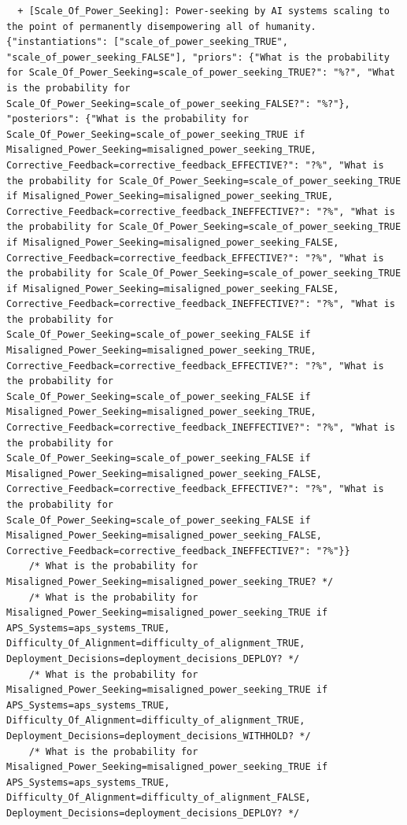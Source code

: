 \documentclass[
  11pt,
  letterpaper,
]{book}
\begin{document}
\begin{verbatim}
  + [Scale_Of_Power_Seeking]: Power-seeking by AI systems scaling to the point of permanently disempowering all of humanity. {"instantiations": ["scale_of_power_seeking_TRUE", "scale_of_power_seeking_FALSE"], "priors": {"What is the probability for Scale_Of_Power_Seeking=scale_of_power_seeking_TRUE?": "%?", "What is the probability for Scale_Of_Power_Seeking=scale_of_power_seeking_FALSE?": "%?"}, "posteriors": {"What is the probability for Scale_Of_Power_Seeking=scale_of_power_seeking_TRUE if Misaligned_Power_Seeking=misaligned_power_seeking_TRUE, Corrective_Feedback=corrective_feedback_EFFECTIVE?": "?%", "What is the probability for Scale_Of_Power_Seeking=scale_of_power_seeking_TRUE if Misaligned_Power_Seeking=misaligned_power_seeking_TRUE, Corrective_Feedback=corrective_feedback_INEFFECTIVE?": "?%", "What is the probability for Scale_Of_Power_Seeking=scale_of_power_seeking_TRUE if Misaligned_Power_Seeking=misaligned_power_seeking_FALSE, Corrective_Feedback=corrective_feedback_EFFECTIVE?": "?%", "What is the probability for Scale_Of_Power_Seeking=scale_of_power_seeking_TRUE if Misaligned_Power_Seeking=misaligned_power_seeking_FALSE, Corrective_Feedback=corrective_feedback_INEFFECTIVE?": "?%", "What is the probability for Scale_Of_Power_Seeking=scale_of_power_seeking_FALSE if Misaligned_Power_Seeking=misaligned_power_seeking_TRUE, Corrective_Feedback=corrective_feedback_EFFECTIVE?": "?%", "What is the probability for Scale_Of_Power_Seeking=scale_of_power_seeking_FALSE if Misaligned_Power_Seeking=misaligned_power_seeking_TRUE, Corrective_Feedback=corrective_feedback_INEFFECTIVE?": "?%", "What is the probability for Scale_Of_Power_Seeking=scale_of_power_seeking_FALSE if Misaligned_Power_Seeking=misaligned_power_seeking_FALSE, Corrective_Feedback=corrective_feedback_EFFECTIVE?": "?%", "What is the probability for Scale_Of_Power_Seeking=scale_of_power_seeking_FALSE if Misaligned_Power_Seeking=misaligned_power_seeking_FALSE, Corrective_Feedback=corrective_feedback_INEFFECTIVE?": "?%"}}
    /* What is the probability for Misaligned_Power_Seeking=misaligned_power_seeking_TRUE? */
    /* What is the probability for Misaligned_Power_Seeking=misaligned_power_seeking_TRUE if APS_Systems=aps_systems_TRUE, Difficulty_Of_Alignment=difficulty_of_alignment_TRUE, Deployment_Decisions=deployment_decisions_DEPLOY? */
    /* What is the probability for Misaligned_Power_Seeking=misaligned_power_seeking_TRUE if APS_Systems=aps_systems_TRUE, Difficulty_Of_Alignment=difficulty_of_alignment_TRUE, Deployment_Decisions=deployment_decisions_WITHHOLD? */
    /* What is the probability for Misaligned_Power_Seeking=misaligned_power_seeking_TRUE if APS_Systems=aps_systems_TRUE, Difficulty_Of_Alignment=difficulty_of_alignment_FALSE, Deployment_Decisions=deployment_decisions_DEPLOY? */

\end{verbatim}
\end{document}
